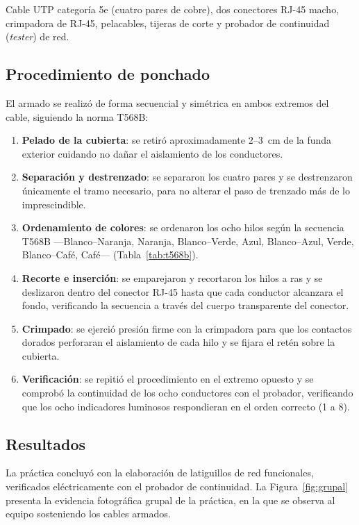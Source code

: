 \documentclass[11pt,a4paper]{article}
\begin{document}
Cable UTP categoría 5e (cuatro pares de cobre), dos conectores RJ-45 macho,
crimpadora de RJ-45, pelacables, tijeras de corte y probador de continuidad
(\textit{tester}) de red.

\subsection{Procedimiento de ponchado}

El armado se realizó de forma secuencial y simétrica en ambos extremos del
cable, siguiendo la norma T568B:

\begin{enumerate}
  \item \textbf{Pelado de la cubierta}: se retiró aproximadamente 2--3~cm de
        la funda exterior cuidando no dañar el aislamiento de los conductores.
  \item \textbf{Separación y destrenzado}: se separaron los cuatro pares y se
        destrenzaron únicamente el tramo necesario, para no alterar el paso de
        trenzado más de lo imprescindible.
  \item \textbf{Ordenamiento de colores}: se ordenaron los ocho hilos según la
        secuencia T568B —Blanco--Naranja, Naranja, Blanco--Verde, Azul,
        Blanco--Azul, Verde, Blanco--Café, Café— (Tabla~\ref{tab:t568b}).
  \item \textbf{Recorte e inserción}: se emparejaron y recortaron los hilos a
        ras y se deslizaron dentro del conector RJ-45 hasta que cada conductor
        alcanzara el fondo, verificando la secuencia a través del cuerpo
        transparente del conector.
  \item \textbf{Crimpado}: se ejerció presión firme con la crimpadora para
        que los contactos dorados perforaran el aislamiento de cada hilo y se
        fijara el retén sobre la cubierta.
  \item \textbf{Verificación}: se repitió el procedimiento en el extremo
        opuesto y se comprobó la continuidad de los ocho conductores con el
        probador, verificando que los ocho indicadores luminosos respondieran
        en el orden correcto (1 a 8).
\end{enumerate}

\subsection{Resultados}

La práctica concluyó con la elaboración de latiguillos de red funcionales,
verificados eléctricamente con el probador de continuidad. La
Figura~\ref{fig:grupal} presenta la evidencia fotográfica grupal de la
práctica, en la que se observa al equipo sosteniendo los cables armados.
\end{document}

